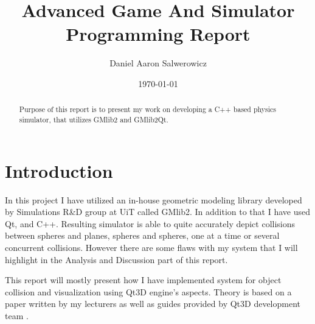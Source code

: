 \documentclass[a4,10pt]{article}
\title{Advanced Game And Simulator Programming Report}
\author{Daniel Aaron Salwerowicz}
\date{\today}
\begin{document}
  
\maketitle

\begin{abstract}
 Purpose of this report is to present my work on developing a C++
 based physics simulator, that utilizes GMlib2 and GMlib2Qt.
\end{abstract}


\section{Introduction}
In this project I have utilized an in-house geometric modeling library developed by Simulations R\&D group at UiT called GMlib2. In addition to that I have used Qt, and C++. Resulting simulator is able to quite accurately depict collisions between spheres and planes, spheres and spheres, one at a time or several concurrent collisions. However there are some flaws with my system that I will highlight in the Analysis and Discussion part of this report.

This report will mostly present how I have implemented system for object collision and visualization using Qt3D engine's aspects. Theory is based on a paper written by my lecturers \cite{bratlie_dalmo_laksaa_brustad_2017} as well as guides provided by Qt3D development team \cite{harmer1_2017} \cite{harmer2_2017}.
\end{document}
